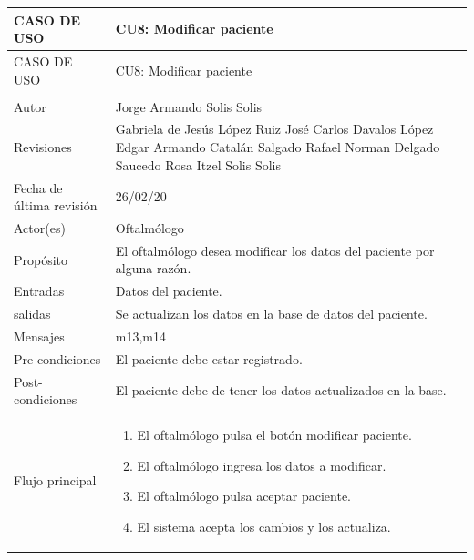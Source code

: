 \documentclass[10pt]{article}
\begin{document}
\newpage 
\begin{longtable}{|p{3.8cm}|p{10.8cm}|}
\hline
CASO DE USO & CU8: Modificar paciente\\
\hline 
\endfirsthead

\hline

CASO DE USO & CU8: Modificar paciente\\
\hline 
\endhead

\multicolumn{2}{c}{}
\endfoot

\endlastfoot
\hline
versión & 1\\
\hline
Autor & Jorge Armando Solis Solis\\
\hline
Revisiones & Gabriela de Jesús López Ruiz\newline
José Carlos Davalos López\newline
Edgar Armando Catalán Salgado\newline
Rafael Norman Delgado Saucedo\newline
Rosa Itzel Solis Solis
\\

\hline
Fecha de última revisión & 26/02/20\\
\hline
Actor(es) & Oftalmólogo \\
\hline
Propósito & El oftalmólogo desea modificar los datos del paciente por alguna razón.\\
\hline
Entradas & Datos del paciente.\\
\hline
salidas & Se actualizan los datos en la base de datos del paciente. \\
\hline
Mensajes & m13,m14\\
\hline
Pre-condiciones & El paciente debe estar registrado.\\
\hline
Post-condiciones & El paciente debe de tener los datos actualizados en la base.\\
\hline
Flujo principal & \begin{enumerate}
    \item El oftalmólogo pulsa el botón modificar paciente.
    \item El oftalmólogo ingresa los datos a modificar.
    \item El oftalmólogo pulsa aceptar paciente.
    \item El sistema acepta los cambios y los actualiza.
    

\end{enumerate}
\end{longtable}
\end{document}
